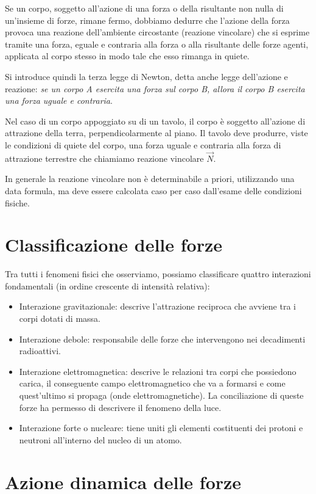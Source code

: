 \documentclass[class=book, crop=false, oneside, 12pt]{standalone}
\begin{document}
Se un corpo, soggetto all'azione di una forza o della risultante non nulla di un'insieme di forze, rimane fermo, dobbiamo dedurre che l'azione della forza provoca una reazione dell'ambiente circostante (reazione vincolare) che si esprime tramite una forza, eguale e contraria alla forza o alla risultante delle forze agenti,
applicata al corpo stesso in modo tale che esso rimanga in quiete.

Si introduce quindi la terza legge di Newton, detta anche legge dell'azione e reazione:
\emph{se un corpo A esercita una forza sul corpo B, allora il corpo B esercita una forza uguale e contraria}.

Nel caso di un corpo appoggiato su di un tavolo, il corpo è soggetto all'azione di attrazione della terra, perpendicolarmente al piano.
Il tavolo deve produrre, viste le condizioni di quiete del corpo, una forza uguale e contraria alla forza di attrazione terrestre che chiamiamo reazione vincolare \(\overrightarrow{N}\).

In generale la reazione vincolare non è determinabile a priori, utilizzando una data formula, ma deve essere calcolata caso per caso dall'esame delle condizioni fisiche.

\section{Classificazione delle forze}

Tra tutti i fenomeni fisici che osserviamo, possiamo classificare quattro interazioni fondamentali (in ordine crescente di intensità relativa):
\begin{itemize}
    \item Interazione gravitazionale: descrive l'attrazione reciproca che avviene tra i corpi dotati di massa.
    \item Interazione debole: responsabile delle forze che intervengono nei decadimenti radioattivi.
    \item Interazione elettromagnetica: descrive le relazioni tra corpi che possiedono carica, il conseguente campo elettromagnetico che va a formarsi e come quest'ultimo si propaga (onde elettromagnetiche). La conciliazione di queste forze ha permesso di descrivere il fenomeno della luce.
    \item Interazione forte o nucleare: tiene uniti gli elementi costituenti dei protoni e neutroni all'interno del nucleo di un atomo.
\end{itemize}

\section{Azione dinamica delle forze}
\end{document}
